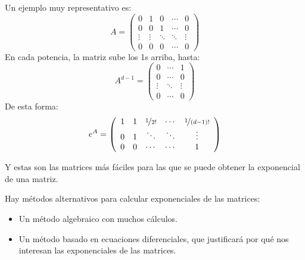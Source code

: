 \begin{ejemplo}
\begin{enumerate}
            Un ejemplo muy representativo es:
            \begin{equation*}
                A = \left(\begin{array}{ccccc}
                        0 & 1 & 0 & \cdots & 0 \\
                        0 & 0 & 1 & \cdots & 0 \\
                        \vdots & \vdots & \ddots & \ddots & \vdots \\
                        0 & 0 & 0 & \cdots & 0
                \end{array}\right)
            \end{equation*}
            En cada potencia, la matriz sube los 1s arriba, hasta:
            \begin{equation*}
                A^{d-1} = \left(\begin{array}{ccc}
                        0 & \cdots & 1 \\
                        0 & \cdots & 0 \\
                        \vdots & \ddots & \vdots \\
                        0  & \cdots & 0
                \end{array}\right)
            \end{equation*}
            De esta forma:
            \begin{equation*}
                e^A = \left(\begin{array}{ccccc}
                        1 & 1 & \nicefrac{1}{2!} & \cdots & \nicefrac{1}{(d-1)!} \\
                        0 & 1 & \ddots & \ddots & \vdots \\
                        0 & 0 & \cdots & \cdots & 1
                \end{array}\right)
            \end{equation*}
    \end{enumerate}
    Y estas son las matrices más fáciles para las que se puede obtener la exponencial de una matriz.
\end{ejemplo}

Hay métodos alternativos para calcular exponenciales de las matrices:
\begin{itemize}
    \item Un método algebraico con muchos cálculos.
    \item Un método basado en ecuaciones diferenciales, que justificará por qué nos interesan las exponenciales de las matrices.
\end{itemize}

